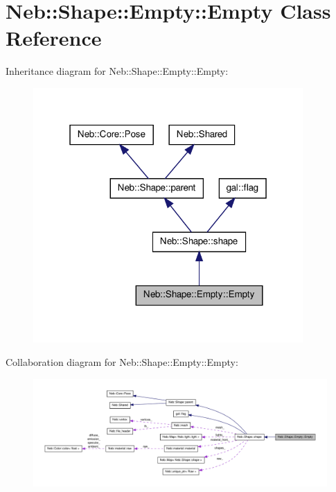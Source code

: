 \hypertarget{classNeb_1_1Shape_1_1Empty_1_1Empty}{\section{\-Neb\-:\-:\-Shape\-:\-:\-Empty\-:\-:\-Empty \-Class \-Reference}
\label{classNeb_1_1Shape_1_1Empty_1_1Empty}
}


\-Inheritance diagram for \-Neb\-:\-:\-Shape\-:\-:\-Empty\-:\-:\-Empty\-:
\nopagebreak
\begin{figure}[H]
\begin{center}
\leavevmode
\includegraphics[width=292pt]{classNeb_1_1Shape_1_1Empty_1_1Empty__inherit__graph}
\end{center}
\end{figure}


\-Collaboration diagram for \-Neb\-:\-:\-Shape\-:\-:\-Empty\-:\-:\-Empty\-:
\nopagebreak
\begin{figure}[H]
\begin{center}
\leavevmode
\includegraphics[width=350pt]{classNeb_1_1Shape_1_1Empty_1_1Empty__coll__graph}
\end{center}
\end{figure}
